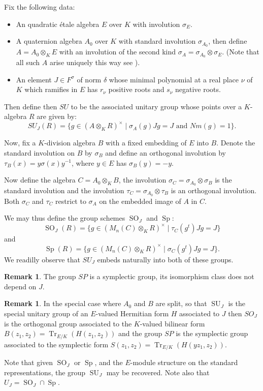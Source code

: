 \documentclass{article}
\theoremstyle{plain}
\theoremstyle{definition}
\newtheorem{remark}[theorem]{Remark}
\numberwithin{equation}{section}
\DeclareMathOperator{\Tr}{Tr}
\DeclareMathOperator{\Sp}{Sp}
\DeclareMathOperator{\SO}{SO}
\DeclareMathOperator{\SU}{SU}
\begin{document}
Fix the following data:
\begin{itemize}
\item An quadratic \'etale algebra $E$ over $K$ with involution $\sigma_E$.
\item A quaternion algebra $A_0$ over $K$ with standard involution $\sigma_{A_0}$, then define $A = A_0\otimes_K E$ with an involution of the second kind $\sigma_A = \sigma_{A_0} \otimes \sigma_E$.
(Note that all such $A$ arise uniquely this way see \cite[2.22]{TODO - book of involutions}).
\item An element $J\in F^\sigma$ of norm $\delta$ whose minimal polynomial at a real place $\nu$ of $K$ which ramifies in $E$ has $r_\nu$ positive roots and $s_\nu$ negative roots.
\end{itemize}
Then define then $SU$ to be the associated unitary group whose points over a $K$-algebra $R$ are given by:
\[ SU_J(R) = \{ g\in (A\otimes_K R)^\times \mid \sigma_A(g)Jg = J \text{ and } Nm(g) = 1 \}. \]

Now, fix a $K$-division algebra $B$ with a fixed embedding of $E$ into $B$. Denote the standard involution on $B$ by $\sigma_{B}$ and define an orthogonal involution by $\tau_B(x) = y\sigma(x)y^{-1}$, where $y\in E$ has $\sigma_B(y) = -y$.

Now define the algebra $C = A_0 \otimes_K B$, the involution $\sigma_C = \sigma_{A_0} \otimes \sigma_B$ is the standard involution and the involution $\tau_C = \sigma_{A_0} \otimes \tau_B$ is an orthogonal involution.
Both $\sigma_C$ and $\tau_C$ restrict to $\sigma_A$ on the embedded image of $A$ in $C$.

We may thus define the group schemes $\SO_J$ and $\Sp$:
\[ \SO_J(R) =  \{ g\in (M_{n}(C) \otimes_K R)^\times \mid \tau_C(g^t)Jg = J  \} \]
and
\[ \Sp(R) =  \{ g\in (M_{n}(C) \otimes_K R)^\times \mid \sigma_C(g^t)Jg = J  \}. \]
We readilly observe that $SU_J$ embeds naturally into both of these groups.
\begin{remark}
The group $SP$ is a symplectic group, its isomorphism class does not depend on $J$.
\end{remark}

\begin{remark}
In the special case where $A_0$ and $B$ are split, so that $\SU_J$ is the special unitary group of an $E$-valued Hermitian form $H$ associated to $J$ then
$SO_J$ is the orthogonal group associated to the $K$-valued bilinear form $B(z_1,z_2) = \Tr_{E/K}(H(z_1,z_2))$ and the group $SP$ is the symplectic group associated to the symplectic form $S(z_1,z_2) = \Tr_{E/K}(H(yz_1,z_2))$.

Note that given $\SO_J$ or $\Sp$, and the $E$-module structure on the standard representations, the group $\SU_J$ may be recovered.
Note also that $U_J = \SO_J \cap \Sp$.
\end{remark}
\end{document}
